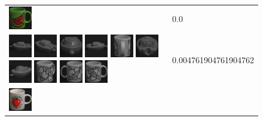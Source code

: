 \begin{figure}[tbp]
\begin{center}
\begin{tabular}{m{11cm} | m{3cm} |}
\includegraphics[width=1cm]{coil/beeld-30.eps}
& {\scriptsize 0.0}
\\
\includegraphics[width=1cm]{coil/beeld-24.eps}
\includegraphics[width=1cm]{coil/beeld-25.eps}
\includegraphics[width=1cm]{coil/beeld-28.eps}
\includegraphics[width=1cm]{coil/beeld-27.eps}
\includegraphics[width=1cm]{coil/beeld-50.eps}
\includegraphics[width=1cm]{coil/beeld-26.eps}
\includegraphics[width=1cm]{coil/beeld-29.eps}
\includegraphics[width=1cm]{coil/beeld-53.eps}
\includegraphics[width=1cm]{coil/beeld-51.eps}
\includegraphics[width=1cm]{coil/beeld-48.eps}
& {\scriptsize 0.004761904761904762}
\\
\includegraphics[width=1cm]{coil/beeld-36.eps}

\end{tabular}
\end{center}
\end{figure}
